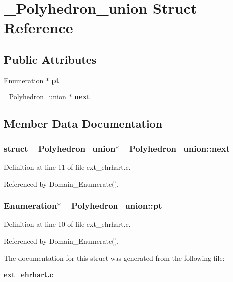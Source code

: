 \section{\_\-Polyhedron\_\-union  Struct Reference}
\label{struct__Polyhedron__union}
\subsection*{Public Attributes}
\begin{CompactItemize}
\item 
Enumeration $\ast$ {\bf pt}
\item 
\_\-Polyhedron\_\-union $\ast$ {\bf next}
\end{CompactItemize}


\subsection{Member Data Documentation}
\subsubsection{\setlength{\rightskip}{0pt plus 5cm}struct \_\-Polyhedron\_\-union$\ast$ \_\-Polyhedron\_\-union::next}\label{struct__Polyhedron__union_m1}




Definition at line 11 of file ext\_\-ehrhart.c.

Referenced by Domain\_\-Enumerate().

\subsubsection{\setlength{\rightskip}{0pt plus 5cm}Enumeration$\ast$ \_\-Polyhedron\_\-union::pt}\label{struct__Polyhedron__union_m0}




Definition at line 10 of file ext\_\-ehrhart.c.

Referenced by Domain\_\-Enumerate().



The documentation for this struct was generated from the following file:\begin{CompactItemize}
\item 
{\bf ext\_\-ehrhart.c}\end{CompactItemize}
